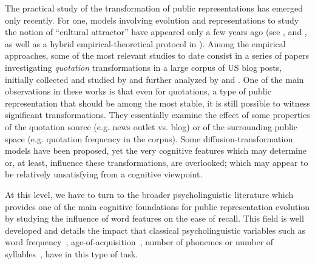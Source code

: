 The practical study of the transformation of public representations has emerged only recently.
For one, models involving evolution and representations to study the notion of ``cultural attractor'' have appeared only a few years ago (see \citealp{Claidiere07}, and \citealp{claidiere2014darwinian}, as well as a hybrid empirical-theoretical protocol in \citealp{maccallum2012evolution}).
Among the empirical approaches, some of the most relevant studies to date consist in a series of papers investigating \emph{quotation} transformations in a large corpus of US blog posts, initially collected and studied by \citet{Leskovec09} and further analyzed by \citet{Simmons11} and \citet{omod-mult}.
One of the main observations in these works is that even for quotations, a type of public representation that should be among the most stable, it is still possible to witness significant transformations. They essentially examine the effect of some properties of the quotation source (\hbox{e.g.} news outlet {vs.} blog) or of the surrounding public space (\hbox{e.g.} quotation frequency in the corpus). Some diffusion-transformation models have been proposed, yet the very cognitive features which may determine or, at least, influence these transformations, are overlooked; which may appear to be relatively unsatisfying from a cognitive viewpoint.


At this level, we have to turn to the broader psycholinguistic literature which provides one of the main cognitive foundations for public representation evolution by studying the influence of word features on the ease of recall.
This field is well developed and details the impact that classical psycholinguistic variables such as word frequency~\citep[see][for a review]{Yonelinas02}, age-of-acquisition~\citep{Zevin02}, number of phonemes or number of syllables~\citep[see for instance][]{Rey98,nick-diss}, have in this type of task.

